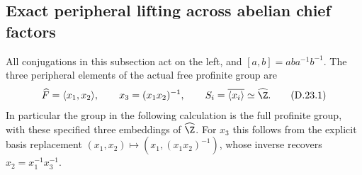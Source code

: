 \subsection{Exact peripheral lifting across abelian chief factors}

All conjugations in this subsection act on the left, and
$[a,b]=aba^{-1}b^{-1}$.  The three peripheral elements of the actual
free profinite group are
\[
 \widehat F=\langle x_1,x_2\rangle,\qquad x_3=(x_1x_2)^{-1},
 \qquad S_i=\overline{\langle x_i\rangle}\simeq\widehat\Z.
 \tag{D.23.1}
\]
In particular the group in the following calculation is the full
profinite group, with these specified three embeddings of
$\widehat\Z$.  For $x_3$ this follows from the explicit basis
replacement $(x_1,x_2)\mapsto(x_1,(x_1x_2)^{-1})$, whose inverse
recovers $x_2=x_1^{-1}x_3^{-1}$.

